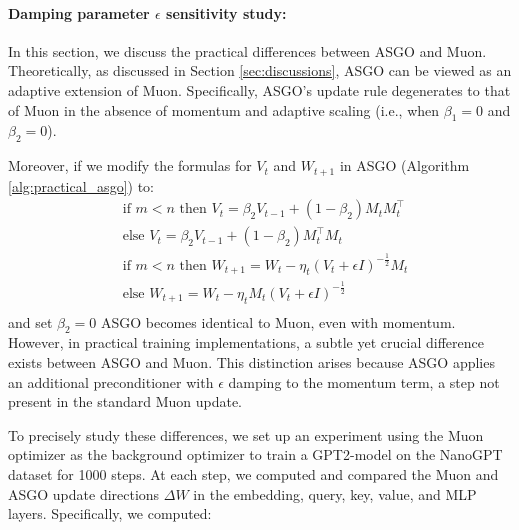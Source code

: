 \documentclass{article}
\theoremstyle{remark}
\begin{document}
\paragraph{Damping parameter $\epsilon$ sensitivity study:}
In this section, we discuss the practical differences between ASGO and Muon. Theoretically, as discussed in Section \ref{sec:discussions}, ASGO can be viewed as an adaptive extension of Muon. Specifically, ASGO's update rule degenerates to that of Muon in the absence of momentum and adaptive scaling (i.e., when $\beta_1 = 0$ and $\beta_2 = 0$).

Moreover, if we modify the formulas for $V_t$ and $W_{t+1}$ in ASGO (Algorithm \ref{alg:practical_asgo}) to:
\begin{equation}
    \begin{aligned}
        & \text{if } m < n \text{ then } V_t=\beta_2 V_{t-1}+\left(1-\beta_2\right) M_t M_t^{\top} \\
        & \text{else } V_t=\beta_2 V_{t-1}+\left(1-\beta_2\right) M_t^{\top} M_t \\
        & \text{if } m < n \text{ then } W_{t+1}=W_t-\eta_t (V_t + \epsilon I)^{-\frac{1}{2}} M_t \\
        & \text{else } W_{t+1}=W_t-\eta_t M_t(V_t + \epsilon I)^{-\frac{1}{2}} \\
    \end{aligned}
\end{equation}
and set $\beta_2 = 0$ ASGO becomes identical to Muon, even with momentum. However, in practical training implementations, a subtle yet crucial difference exists between ASGO and Muon. This distinction arises because ASGO applies an additional preconditioner with $\epsilon$ damping to the momentum term, a step not present in the standard Muon update.

To precisely study these differences, we set up an experiment using the Muon optimizer as the background optimizer to train a GPT2-model on the NanoGPT dataset for 1000 steps. At each step, we computed and compared the Muon and ASGO update directions $\Delta W$ in the embedding, query, key, value, and MLP layers. Specifically, we computed:
\end{document}
